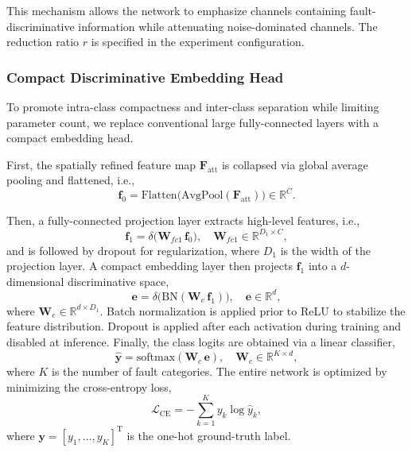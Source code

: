 \documentclass[pdflatex,sn-mathphys-num]{sn-jnl}
\theoremstyle{thmstyleone}%
\theoremstyle{thmstyletwo}%
\theoremstyle{thmstylethree}%
\begin{document}
This mechanism allows the network to emphasize channels containing fault-discriminative information while attenuating noise-dominated channels. The reduction ratio $r$ is specified in the experiment configuration.

\subsubsection{Compact Discriminative Embedding Head}

To promote intra-class compactness and inter-class separation while limiting parameter count, we replace conventional large fully-connected layers with a compact embedding head.

First, the spatially refined feature map $\boldsymbol{F}_{\mathrm{att}}$ is collapsed via global average pooling and flattened, i.e.,
\begin{equation}
\boldsymbol{f}_0 = \mathrm{Flatten}\big(\mathrm{AvgPool}(\boldsymbol{F}_{\mathrm{att}})\big) \in \mathbb{R}^{C}.
\label{eq:flatten_feature}
\end{equation}

Then, a fully-connected projection layer extracts high-level features, i.e.,
\begin{equation}
\boldsymbol{f}_1 = \delta\big(\boldsymbol{W}_{\!fc1}\, \boldsymbol{f}_0\big), \quad \boldsymbol{W}_{\!fc1} \in \mathbb{R}^{D_1 \times C},
\label{eq:fc1_feature}
\end{equation}
and is followed by dropout for regularization, where $D_1$ is the width of the projection layer. A compact embedding layer then projects $\boldsymbol{f}_1$ into a $d$-dimensional discriminative space,
\begin{equation}
\boldsymbol{e} = \delta\big(\mathrm{BN}(\boldsymbol{W}_{\!e}\, \boldsymbol{f}_1)\big), \quad \boldsymbol{e} \in \mathbb{R}^{d},
\label{eq:embedding}
\end{equation}
where $\boldsymbol{W}_{\!e} \in \mathbb{R}^{d \times D_1}$. Batch normalization is applied prior to ReLU to stabilize the feature distribution. Dropout is applied after each activation during training and disabled at inference. Finally, the class logits are obtained via a linear classifier,
\begin{equation}
\hat{\boldsymbol{y}} = \mathrm{softmax}(\boldsymbol{W}_{\!c}\, \boldsymbol{e}), \quad \boldsymbol{W}_{\!c} \in \mathbb{R}^{K \times d},
\label{eq:classifier}
\end{equation}
where $K$ is the number of fault categories. The entire network is optimized by minimizing the cross-entropy loss,
\begin{equation}
\mathcal{L}_{\mathrm{CE}} = -\sum_{k=1}^{K} y_k \log \hat{y}_k,
\label{eq:cross_entropy_loss}
\end{equation}
where $\boldsymbol{y} = [y_1, \dots, y_K]^\mathrm{T}$ is the one-hot ground-truth label.
\end{document}
